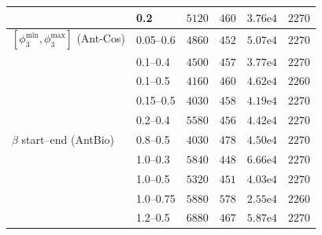 \begin{tabular}{llrrrr}
 & 0.2 & $5120$ & $460$ & $3.76\mathrm{e}{4}$ & $2270$ \\
\midrule
$[\phi_3^{\min},\phi_3^{\max}]$ (Ant-Cos) & 0.05--0.6 & $4860$ & $452$ & $5.07\mathrm{e}{4}$ & $2270$ \\
 & 0.1--0.4 & $4500$ & $457$ & $3.77\mathrm{e}{4}$ & $2270$ \\
 & 0.1--0.5 & $4160$ & $460$ & $4.62\mathrm{e}{4}$ & $2260$ \\
 & 0.15--0.5 & $4030$ & $458$ & $4.19\mathrm{e}{4}$ & $2270$ \\
 & 0.2--0.4 & $5580$ & $456$ & $4.42\mathrm{e}{4}$ & $2270$ \\
\midrule
$\beta$ start--end (AntBio) & 0.8--0.5 & $4030$ & $478$ & $4.50\mathrm{e}{4}$ & $2270$ \\
 & 1.0--0.3 & $5840$ & $448$ & $6.66\mathrm{e}{4}$ & $2270$ \\
 & 1.0--0.5 & $5320$ & $451$ & $4.03\mathrm{e}{4}$ & $2270$ \\
 & 1.0--0.75 & $5880$ & $578$ & $2.55\mathrm{e}{4}$ & $2260$ \\
 & 1.2--0.5 & $6880$ & $467$ & $5.87\mathrm{e}{4}$ & $2270$ \\
\bottomrule
\end{tabular}
